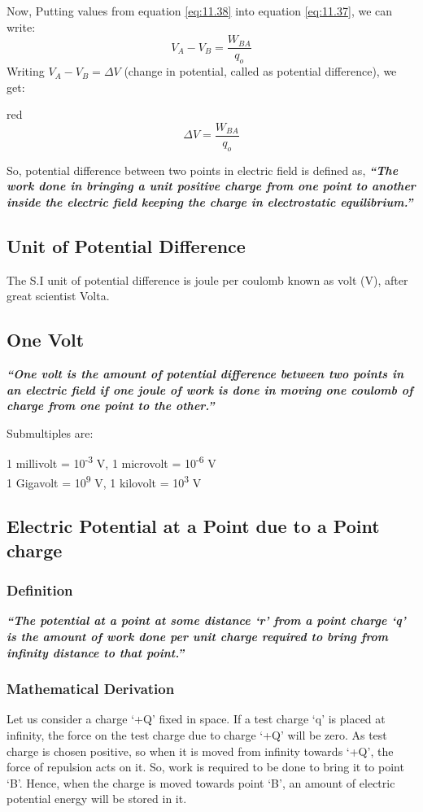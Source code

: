 Now, Putting values from equation \ref{eq:11.38} into equation \ref{eq:11.37}, we can
write:
\begin{equation}
  V_{A} - V_{B} = \frac{W_{BA}}{q_{o}} \nonumber
\end{equation}
Writing $V_{A} - V_{B} = \Delta V$ (change in potential, called as potential difference),
we get:
\begin{mybox}{red}{}
\begin{equation}\label{eq:11.42}
  \Delta V = \frac{W_{BA}}{q_{o}}
\end{equation}
\end{mybox}
So, potential difference between two points in electric field is defined as,
\textit{\textbf{“The work done in bringing a unit positive charge from one point to another
inside the electric field keeping the charge in electrostatic equilibrium.”}}
\subsection*{Unit of Potential Difference}
The S.I unit of potential difference is joule per coulomb known 
as volt (V), after great scientist Volta.
\subsection*{One Volt}
\textit{\textbf{“One volt is the amount of potential difference between
two points in an electric field if one joule of work is done in moving
one coulomb of charge from one point to the other.”}}

\noindent Submultiples are:
\begin{center}
  1 millivolt = 10\textsuperscript{-3} V, 1 microvolt = 10\textsuperscript{-6} V \\
  1 Gigavolt = 10\textsuperscript{9} V, 1 kilovolt = 10\textsuperscript{3} V
\end{center}

\subsection{Electric Potential at a Point due to a Point charge}
\subsubsection{Definition}
\textit{\textbf{“The potential at a point at some distance ‘r’ from a point charge ‘q’ is the amount of work done per
unit charge required to bring from infinity distance to that point.”}}
\subsubsection{Mathematical Derivation}
Let us consider a charge ‘+Q’ fixed in space. If a test charge ‘q’ is placed
at infinity, the force on the test charge due to charge ‘+Q’ will be zero.
As test charge is chosen positive, so when it is moved from infinity towards ‘+Q’,
the force of repulsion acts on it. So, work is required to be done to bring it to
point ‘B’. Hence, when the charge is moved towards point ‘B’,
an amount of electric potential energy will be stored in it.

